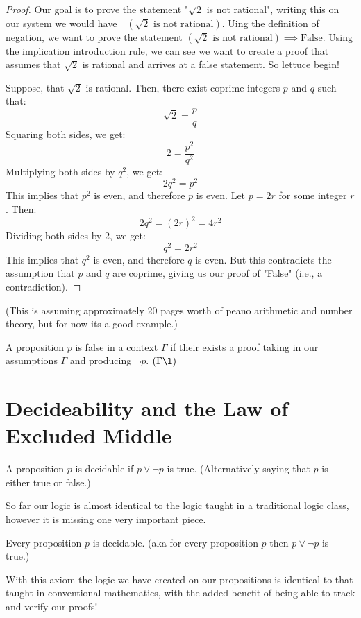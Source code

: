 \begin{example}
    \begin{proof}
        Our goal is to prove the statement "$\sqrt{2}$ is not rational", writing this on our system we would have $\neg (\sqrt{2}\text{ is not rational})$. Uing the definition of negation, we want to prove the statement $ (\sqrt{2}\text{ is not rational}) \implies \text{False}$. Using the implication introduction rule, we can see we want to create a proof that assumes that $\sqrt{2}$ is rational and arrives at a false statement. So lettuce begin!
        
        Suppose, that $\sqrt{2}$ is rational. Then, there exist coprime integers $p$ and $q$ such that:
        $$\sqrt{2} = \frac{p}{q}$$
        Squaring both sides, we get:
        $$2 = \frac{p^2}{q^2}$$
        Multiplying both sides by $q^2$, we get:
        $$2q^2 = p^2$$
        This implies that $p^2$ is even, and therefore $p$ is even. Let $p = 2r$ for some integer $r$. Then:
        $$2q^2 = (2r)^2 = 4r^2$$
        Dividing both sides by 2, we get:
        $$q^2 = 2r^2$$
        This implies that $q^2$ is even, and therefore $q$ is even. But this contradicts the assumption that $p$ and $q$ are coprime, giving us our proof of "False" (i.e., a contradiction). 
    \end{proof}
    (This is assuming approximately 20 pages worth of peano arithmetic and number theory, but for now its a good example.)
\end{example}

\begin{definition}[Falsity]
    A proposition $p$ is false in a context $\Gamma$ if their exists a proof taking in our assumptions $\Gamma$ and producing $\neg p$. $(\Gamma \l)$
\end{definition}

\section{Decideability and the Law of Excluded Middle}
\begin{definition}[Decideability]
    A proposition $p$ is decidable if $p \lor \neg p$ is true. (Alternatively saying that $p$ is either true or false.)
\end{definition}
So far our logic is almost identical to the logic taught in a traditional logic class, however it is missing one very important piece.
\begin{axiom}
    Every proposition $p$ is decidable. (aka for every proposition $p$ then $p \lor \neg p$ is true.)
\end{axiom}
With this axiom the logic we have created on our propositions is identical to that taught in conventional mathematics, with the added benefit of being able to track and verify our proofs!

